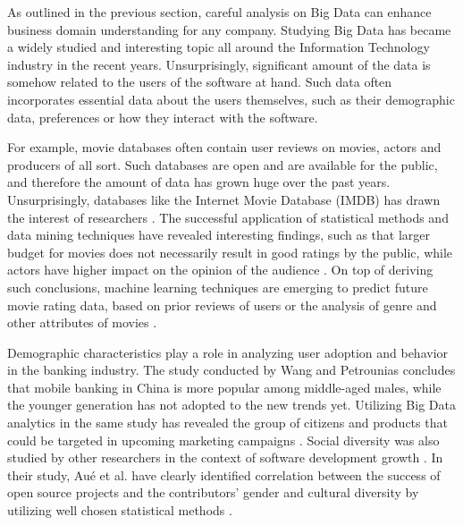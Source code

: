 As outlined in the previous section, careful analysis on Big Data can enhance business domain understanding for any company. Studying Big Data has became a widely studied and interesting topic all around the Information Technology industry in the recent years. Unsurprisingly, significant amount of the data is somehow related to the users of the software at hand. Such data often incorporates essential data about the users themselves, such as their demographic data, preferences or how they interact with the software.      

For example, movie databases often contain user reviews on movies, actors and producers of all sort. Such databases are open and are available for the public, and therefore the amount of data has grown huge over the past years. Unsurprisingly, databases like the Internet Movie Database (IMDB) has drawn the interest of researchers \cite{saraee2004data, kabinsingha2012movie, sumathi2013performance}. The successful application of statistical methods and data mining techniques have revealed interesting findings, such as that larger budget for movies does not necessarily result in good ratings by the public, while actors have higher impact on the opinion of the audience \cite{saraee2004data}. On top of deriving such conclusions, machine learning techniques are emerging to predict future movie rating data, based on prior reviews of users \cite{saraee2004data} or the analysis of genre and other attributes of movies \cite{kabinsingha2012movie}.

Demographic characteristics play a role in analyzing user adoption and behavior in the banking industry. The study conducted by Wang and Petrounias \cite{chinesemobilebankingusers} concludes that mobile banking in China is more popular among middle-aged males, while the younger generation has not adopted to the new trends yet. Utilizing Big Data analytics in the same study has revealed the group of citizens and products that could be targeted in upcoming marketing campaigns \cite{chinesemobilebankingusers}. Social diversity was also studied by other researchers in the context of software development growth \cite{socialdiversityongithub}. In their study, Aué et al. have clearly identified correlation between the success of open source projects and the contributors' gender and cultural diversity by utilizing well chosen statistical methods \cite{socialdiversityongithub}.

